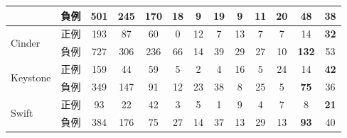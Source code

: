 \documentclass[T,J]{fose} %
\begin{document}
\begin{table}[]
{\begin{tabular}{l|l|c|c|c|cc|cc|cc|cc}
                                            & 負例                                         & 501                                       & 245                                         & 170                                          & 18        & 9          & 19        & 9          & 11        & 20         & {\textbf{48}}         & 38        \\ \hline
\multirow{2}{*}{Cinder}                     & 正例                                         & 193                                       & 87                                          & 60                                           & 0         & 12         & 7         & 13         & 7         & 7          & 14         & {\textbf{32}}        \\
                                            & 負例                                         & 727                                       & 306                                         & 236                                          & 66        & 14         & 39        & 29         & 27        & 10         & {\textbf{132}}        & 53        \\  \hline
\multirow{2}{*}{Keystone}                   & 正例                                         & 159                                       & 44                                          & 59                                           & 5         & 2          & 4         & 16         & 5         & 24         & 14         & {\textbf{42}}        \\
                                            & 負例                                         & 349                                       & 147                                         & 91                                           & 12        & 23         & 38        & 8          & 25        & 5          & {\textbf{75}}         & 36        \\ \hline
\multirow{2}{*}{Swift}                      & 正例                                         & 93                                        & 22                                          & 42                                           & 3         & 5          & 1         & 9          & 4         & 7          & 8          & {\textbf{21}}        \\
                                            & 負例                                         & 384                                       & 176                                         & 75                                           & 27        & 14         & 37        & 13         & 29        & 13         & {\textbf{93}}         & 40        \\  \hline

\end{tabular}}
\end{table}
\end{document}
